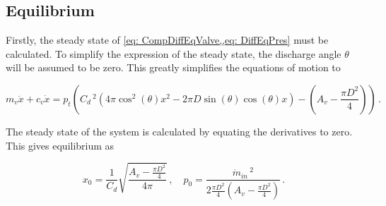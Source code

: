 \subsection{Equilibrium}





Firstly, the steady state of \cref{eq: CompDiffEqValve,,eq: DiffEqPres} must be calculated. To simplify the expression of the steady state, the discharge angle $\theta$ will be assumed to be zero. This greatly simplifies the equations of motion to

\begin{equation} \label{eq: ClosingDiffEqFull}
    m_v \ddot{x} + c_v \dot{x} = p_t \left(
    C_d \,^2 \left( 4 \pi \cos^2(\theta) x^2
    - 2 \pi D \sin(\theta) \cos(\theta) x \right)
    - \left( A_v - \frac{\pi D^2}{4} \right)
    \right) \, .
\end{equation}

The steady state of the system is calculated by equating the derivatives to zero. This gives equilibrium as

\begin{equation*}
    x_0 = \frac{1}{C_d} \sqrt{\frac{A_v - \frac{\pi D^2}{4}}{4 \pi}}
    \, , \quad
    p_0 = \frac{\dot{m}_{in} \,^2}{2 \frac{\pi D^2}{4} \left( A_v - \frac{\pi D^2}{4} \right)} \, .
\end{equation*}



